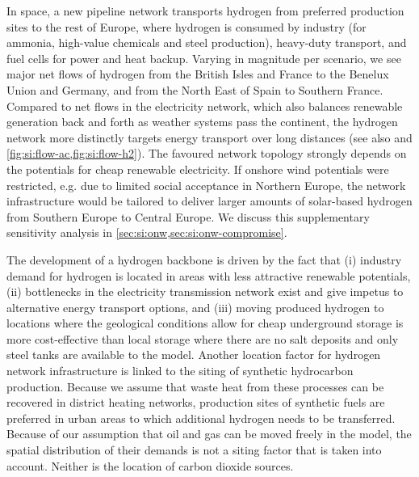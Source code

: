 In space, a new pipeline network transports hydrogen from preferred production
sites to the rest of Europe, where hydrogen is consumed by industry (for
ammonia, high-value chemicals and steel production), heavy-duty transport, and
fuel cells for power and heat backup. Varying in magnitude per scenario, we see
major net flows of hydrogen from the British Isles and France to the Benelux
Union and Germany, and from the North East of Spain to Southern France. Compared
to net flows in the electricity network, which also balances renewable
generation back and forth as weather systems pass the continent, the hydrogen
network more distinctly targets energy transport over long distances (see also
 and \cref{fig:si:flow-ac,fig:si:flow-h2}). The
favoured network topology strongly depends on the potentials for cheap renewable
electricity. If onshore wind potentials were restricted, e.g. due to limited
social acceptance in Northern Europe, the network infrastructure would be
tailored to deliver larger amounts of solar-based hydrogen from Southern Europe
to Central Europe. We discuss this supplementary sensitivity analysis in
\cref{sec:si:onw,sec:si:onw-compromise}.

The development of a hydrogen backbone is driven by the fact that (i) industry
demand for hydrogen is located in areas with less attractive renewable
potentials, (ii) bottlenecks in the electricity transmission network exist and
give impetus to alternative energy transport options, and (iii) moving produced
hydrogen to locations where the geological conditions allow for cheap
underground storage is more cost-effective than local storage where there are no
salt deposits and only steel tanks are available to the model. Another location
factor for hydrogen network infrastructure is linked to the siting of synthetic
hydrocarbon production. Because we assume that waste heat from these processes
can be recovered in district heating networks, production sites of synthetic
fuels are preferred in urban areas to which additional hydrogen needs to be
transferred. Because of our assumption that oil and gas can be moved freely in
the model, the spatial distribution of their demands is not a siting factor that
is taken into account. Neither is the location of carbon dioxide sources.

